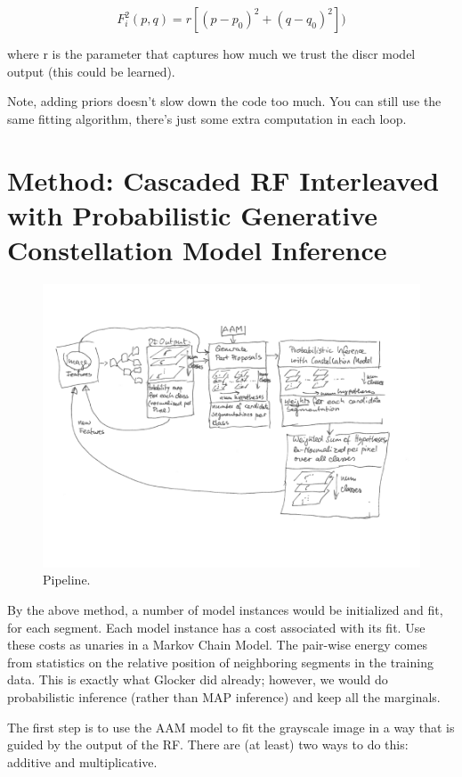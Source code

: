 \documentclass[10pt,twocolumn,letterpaper]{article}
\begin{document}
\[ F_i^2(p,q) = r[(p-p_0)^2+(q-q_0)^2]) \]

where r is the parameter that captures how much we trust the discr model output (this could be learned).

Note, adding priors doesn't slow down the code too much.  You can still use the same fitting algorithm, there's just some extra computation in each loop.


\section{Method: Cascaded RF Interleaved with Probabilistic Generative Constellation Model Inference}
\begin{figure}[t]
\begin{center}
\includegraphics[width=\textwidth]{Pipeline.png} %
\caption{Pipeline.}
\label{tab:pipeline}
\end{center}
\end{figure}



By the above method, a number of model instances would be initialized and fit, for each segment.  Each model instance has a cost associated with its fit.  Use these costs as unaries in a Markov Chain Model.  The pair-wise energy comes from statistics on the relative position of neighboring segments in the training data.  This is exactly what Glocker did already; however, we would do probabilistic inference (rather than MAP inference) and keep all the marginals.


The first step is to use the AAM model to fit the grayscale image in a way that is guided by the output of the RF.  There are (at least) two ways to do this: additive and multiplicative.
\end{document}
